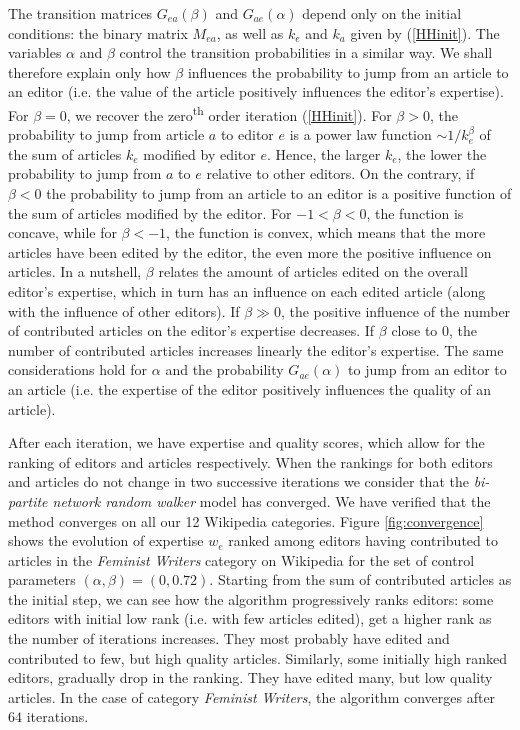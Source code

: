The transition matrices $G_{ea}(\beta)$ and $G_{ae}(\alpha)$ depend only on the initial conditions: the binary matrix $M_{ea}$, as well as $k_e$ and $k_a$ given by (\ref{HHinit}). The variables $\alpha$ and $\beta$ control the transition probabilities in a similar way. We shall therefore explain only how $\beta$ influences the probability to jump from an article to an editor (i.e. the value of the article positively influences the editor's expertise). For $\beta = 0$, we recover the zero\textsuperscript{th} order iteration (\ref{HHinit}). For $\beta > 0$, the probability to jump from article $a$ to editor $e$ is a power law function $\sim 1/k_{e}^{\beta}$ of the sum of articles $k_{e}$  modified by editor $e$. Hence, the larger $k_{e}$, the lower the probability to jump from $a$ to $e$ relative to other editors. On the contrary, if $\beta < 0$ the probability to jump from an article to an editor is a positive function of the sum of articles modified by the editor. For $-1 < \beta < 0$, the function is concave, while for $\beta < -1$, the function is convex, which means that the more articles have been edited by the editor, the even more the positive influence on articles. In a nutshell, $\beta$ relates the amount of articles edited on the overall editor's expertise, which in turn has an influence on each edited article (along with the influence of other editors). If $\beta \gg 0$, the positive influence of the number of contributed articles on the editor's expertise decreases. If $\beta$ close to $0$, the number of contributed articles increases linearly the editor's expertise. The same considerations hold for $\alpha$ and the probability $G_{ae}(\alpha)$ to jump from an editor to an article (i.e. the expertise of the editor positively influences the quality of an article).

After each iteration, we have expertise and quality scores, which allow for the ranking of editors and articles respectively. When the rankings for both editors and articles do not change in two successive iterations we consider that the {\it bi-partite network random walker} model has converged. We have verified that the method converges on all our 12 Wikipedia categories.  Figure \ref{fig:convergence} shows the evolution of expertise $w_e$ ranked among editors having contributed to articles in the {\it Feminist Writers} category on Wikipedia for the set of control parameters $(\alpha,\beta) =(0, 0.72)$. Starting from the sum of contributed articles as the initial step, we can see how the algorithm progressively ranks editors: some editors with initial low rank (i.e. with few articles edited), get a higher rank as the number of iterations increases. They most probably have edited and contributed to few, but high quality articles. Similarly, some initially high ranked editors, gradually drop in the ranking. They have edited many, but low quality articles. In the case of category {\it Feminist Writers}, the algorithm converges after $64$ iterations.

